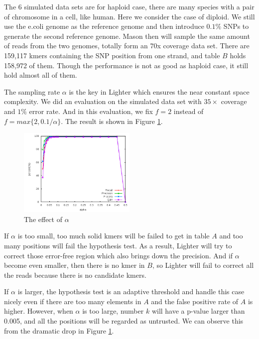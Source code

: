 \documentclass[10pt]{article}
\begin{document}
The 6 simulated data sets are for haploid case, there are many species with a pair of chromosome in a cell, like human. Here we consider the case of diploid. We still use the e.coli genome as the reference genome and then introduce $0.1\%$ SNPs to generate the second reference genome. Mason then will sample the same amount of reads from the two genomes, totally form an $70$x coverage data set. There are 159,117 kmers containing the SNP position from one strand, and table $B$ holds 158,972 of them. Though the performance is not as good as haploid case, it still hold almost all of them. 

The sampling rate $\alpha$ is the key in Lighter which ensures the near constant space complexity. We did an evaluation on the simulated data set with $35\times$ coverage and $1\%$ error rate. And in this evaluation, we fix $f=2$ instead of $f=max\{2,0.1/\alpha\}$. The result is shown in Figure \ref{fig:alpha}.

\begin{figure}[h!]
\begin{center}
\includegraphics[width=0.5\textwidth]{alpha.png}
\caption{The effect of $\alpha$\label{fig:alpha}}
\end{center}
\end{figure}

If $\alpha$ is too small, too much solid kmers will be failed to get in table $A$ and too many positions will fail the hypothesis test. As a result, Lighter will try to correct those error-free region which also brings down the precision. And if $\alpha$ become even smaller, then there is no kmer in $B$, so Lighter will fail to correct all the reads because there is no candidate kmers. 

If $\alpha$ is larger, the hypothesis test is an adaptive threshold and handle this case nicely even if there are too many elements in $A$ and the false positive rate of $A$ is higher. However, when $\alpha$ is too large, number $k$ will have a p-value larger than 0.005, and all the positions will be regarded as untrusted. We can observe this from the dramatic drop in Figure \ref{fig:alpha}.
\end{document}
